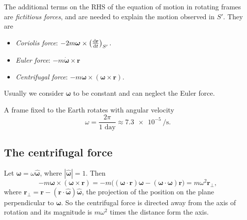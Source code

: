 \documentclass[a4paper]{article}
\begin{document}
\begin{defi}
  The additional terms on the RHS of the equation of motion in rotating frames are \emph{fictitious forces}, and are needed to explain the motion observed in $S'$. They are
  \begin{itemize}
    \item \emph{Coriolis force}: $-2m\boldsymbol\omega \times \left(\frac{\mathrm{d} \mathbf{r}}{\mathrm{d} t}\right)_{S'}.$
    \item \emph{Euler force}: $-m\dot{\boldsymbol\omega}\times \mathbf{r}$
    \item \emph{Centrifugal force}: $-m\boldsymbol\omega\times(\boldsymbol\omega\times \mathbf{r})$.
  \end{itemize}
\end{defi}
Usually we consider $\boldsymbol \omega$ to be constant and can neglect the Euler force.

A frame fixed to the Earth rotates with angular velocity
\[
  \omega = \frac{2\pi}{1\text{ day}} \approx \SI{7.3e-5}{\per\second}.
\]
\subsection{The centrifugal force}
Let $\boldsymbol\omega = \omega\hat{\boldsymbol\omega}$, where $|\hat{\boldsymbol\omega}| = 1$. Then
\[
  -m\boldsymbol\omega \times (\boldsymbol\omega \times \mathbf{r}) = -m\big((\boldsymbol\omega \cdot \mathbf{r})\boldsymbol\omega - (\boldsymbol\omega \cdot \boldsymbol\omega)\mathbf{r}\big) = m\omega^2 \mathbf{r}_{\bot},
\]
where $\mathbf{r}_{\bot} = \mathbf{r} - (\mathbf{r}\cdot \hat{\boldsymbol\omega})\hat{\boldsymbol\omega}$, the projection of the position on the plane perpendicular to $\boldsymbol\omega$. So the centrifugal force is directed away from the axis of rotation and its magnitude is $m\omega^2$ times the distance form the axis.
\end{document}
